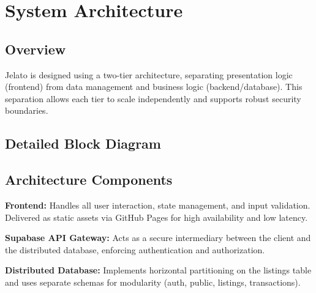 \documentclass[12pt,a4paper]{report}
\begin{document}
\chapter{System Architecture}
\section{Overview}
Jelato is designed using a two-tier architecture, separating presentation logic (frontend) from data management and business logic (backend/database). This separation allows each tier to scale independently and supports robust security boundaries.

\section{Detailed Block Diagram}
\begin{center}
\end{center}

\section{Architecture Components}
\textbf{Frontend:} Handles all user interaction, state management, and input validation. Delivered as static assets via GitHub Pages for high availability and low latency.

\textbf{Supabase API Gateway:} Acts as a secure intermediary between the client and the distributed database, enforcing authentication and authorization.

\textbf{Distributed Database:} Implements horizontal partitioning on the listings table and uses separate schemas for modularity (auth, public, listings, transactions).
\end{document}
